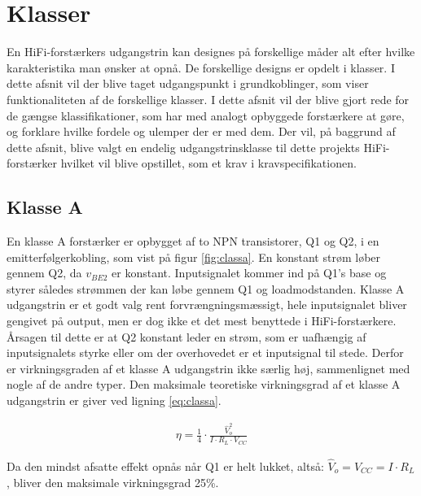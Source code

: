 \section{Klasser}
En HiFi-forstærkers udgangstrin kan designes på forskellige måder alt efter hvilke karakteristika man ønsker at opnå. De forskellige designs er opdelt i klasser. I dette afsnit vil der blive taget udgangspunkt i grundkoblinger, som viser funktionaliteten af de forskellige klasser. 
I dette afsnit vil der blive gjort rede for de gængse klassifikationer, som har med analogt opbyggede forstærkere at gøre, og forklare hvilke fordele og ulemper der er med dem. Der vil, på baggrund af dette afsnit, blive valgt en endelig udgangstrinsklasse til dette projekts HiFi-forstærker hvilket vil blive opstillet, som et krav i kravspecifikationen.

\subsection{Klasse A}

En klasse A forstærker er opbygget af to NPN transistorer, Q1 og Q2, i en emitterfølgerkobling, som vist på figur \ref{fig:classa}. En konstant strøm løber gennem Q2, da $v_{BE2}$ er konstant. Inputsignalet kommer ind på Q1's base og styrer således strømmen der kan løbe gennem Q1 og loadmodstanden. 
Klasse A udgangstrin er et godt valg rent forvrængningsmæssigt, hele inputsignalet bliver gengivet på output, men er dog ikke et det mest benyttede i HiFi-forstærkere. Årsagen til dette er at Q2 konstant leder en strøm, som er uafhængig af inputsignalets styrke eller om der overhovedet er et inputsignal til stede. Derfor er virkningsgraden af et klasse A udgangstrin ikke særlig høj, sammenlignet med nogle af de andre typer. Den maksimale teoretiske virkningsgrad af et klasse A udgangstrin er giver ved ligning \ref{eq:classa}.

\begin{eqnarray}
\eta=\frac{1}{4} \cdot \frac{\widehat{V}_o^2}{I \cdot R_L \cdot V_{CC}}  \label{eq:classa}
\end{eqnarray}


Da den mindst afsatte effekt opnås når Q1 er helt lukket, altså: $ \widehat{V}_o=V_{CC}=I \cdot R_L $, bliver den maksimale virkningsgrad 25\%.


